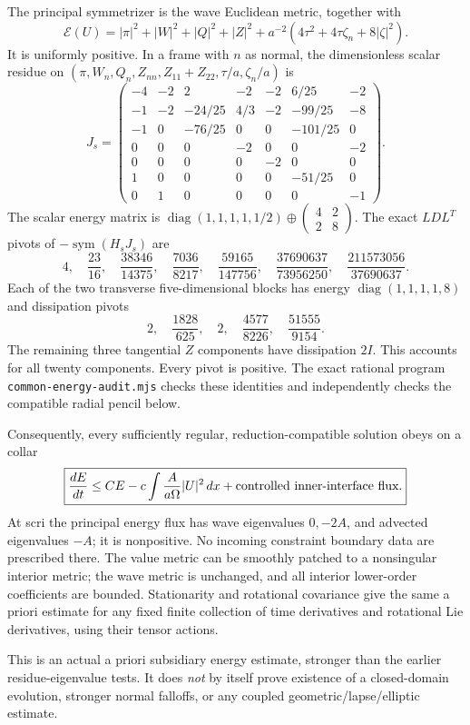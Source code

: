 \documentclass[11pt]{article}
\begin{document}
The principal symmetrizer is the wave Euclidean metric, together with
\[
\boxed{
\mathcal E(U)=|\pi|^2+|W|^2+|Q|^2+|Z|^2+
a^{-2}(4\tau^2+4\tau\zeta_n+8|\zeta|^2).
}
\]
It is uniformly positive. In a frame with $n$ as normal,
the dimensionless scalar residue on
$(\pi,W_n,Q_n,Z_{nn},Z_{11}+Z_{22},\tau/a,\zeta_n/a)$ is
\[
J_s=
\begin{pmatrix}
-4&-2&2&-2&-2&6/25&-2\\
-1&-2&-24/25&4/3&-2&-99/25&-8\\
-1&0&-76/25&0&0&-101/25&0\\
0&0&0&-2&0&0&-2\\
0&0&0&0&-2&0&0\\
1&0&0&0&0&-51/25&0\\
0&1&0&0&0&0&-1
\end{pmatrix}.
\]
The scalar energy matrix is
$\operatorname{diag}(1,1,1,1,1/2)\oplus
\left(\begin{smallmatrix}4&2\\2&8\end{smallmatrix}\right)$.
The exact $LDL^T$ pivots of $-\operatorname{sym}(H_sJ_s)$ are
\[
4,\quad\frac{23}{16},\quad\frac{38346}{14375},\quad
\frac{7036}{8217},\quad\frac{59165}{147756},\quad
\frac{37690637}{73956250},\quad\frac{211573056}{37690637}.
\]
Each of the two transverse five-dimensional blocks has energy
$\operatorname{diag}(1,1,1,1,8)$ and dissipation pivots
\[
2,\quad\frac{1828}{625},\quad2,\quad
\frac{4577}{8226},\quad\frac{51555}{9154}.
\]
The remaining three tangential $Z$ components have dissipation $2I$.
This accounts for all twenty components. Every pivot is positive.
The exact rational program \texttt{common-energy-audit.mjs} checks
these identities and independently checks the compatible radial
pencil below.

Consequently, every sufficiently regular, reduction-compatible solution
obeys on a collar
\[
\boxed{
\frac{dE}{dt}\leq C E
-c\int\frac{A}{a\Omega}|U|^2\,dx
+\hbox{controlled inner-interface flux}.
}
\]
At scri the principal energy flux has wave eigenvalues $0,-2A$,
and advected eigenvalues $-A$; it is nonpositive. No incoming
constraint boundary data are prescribed there. The value metric can
be smoothly patched to a nonsingular interior metric; the wave metric
is unchanged, and all interior lower-order coefficients are bounded.
Stationarity and rotational covariance give the same a priori
estimate for any fixed finite collection of time derivatives and
rotational Lie derivatives, using their tensor actions.

This is an actual a priori subsidiary energy estimate, stronger than
the earlier residue-eigenvalue tests. It does \emph{not} by itself
prove existence of a closed-domain evolution, stronger normal
falloffs, or any coupled geometric/lapse/elliptic estimate.
\end{document}
